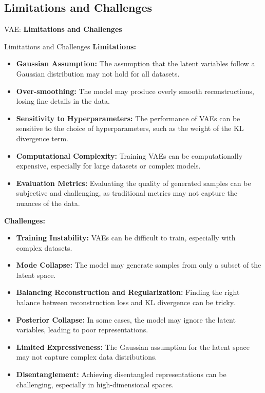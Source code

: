 \subsection{Limitations and Challenges}
\begin{frame}{}
	\LARGE VAE: \textbf{Limitations and Challenges}
\end{frame}

\begin{frame}[allowframebreaks]{Limitations and Challenges}
\textbf{Limitations:}
\begin{itemize}
    \item \textbf{Gaussian Assumption:} The assumption that the latent variables follow a Gaussian distribution may not hold for all datasets.
    \item \textbf{Over-smoothing:} The model may produce overly smooth reconstructions, losing fine details in the data.
    \item \textbf{Sensitivity to Hyperparameters:} The performance of VAEs can be sensitive to the choice of hyperparameters, such as the weight of the KL divergence term.
    \item \textbf{Computational Complexity:} Training VAEs can be computationally expensive, especially for large datasets or complex models.
    \item \textbf{Evaluation Metrics:} Evaluating the quality of generated samples can be subjective and challenging, as traditional metrics may not capture the nuances of the data.
\end{itemize}
\framebreak

\textbf{Challenges:}
\begin{itemize}
    \item \textbf{Training Instability:} VAEs can be difficult to train, especially with complex datasets.
    \item \textbf{Mode Collapse:} The model may generate samples from only a subset of the latent space.
    \item \textbf{Balancing Reconstruction and Regularization:} Finding the right balance between reconstruction loss and KL divergence can be tricky.
    \item \textbf{Posterior Collapse:} In some cases, the model may ignore the latent variables, leading to poor representations.
    \item \textbf{Limited Expressiveness:} The Gaussian assumption for the latent space may not capture complex data distributions.
    \item \textbf{Disentanglement:} Achieving disentangled representations can be challenging, especially in high-dimensional spaces.
\end{itemize}
\framebreak


\end{frame}
